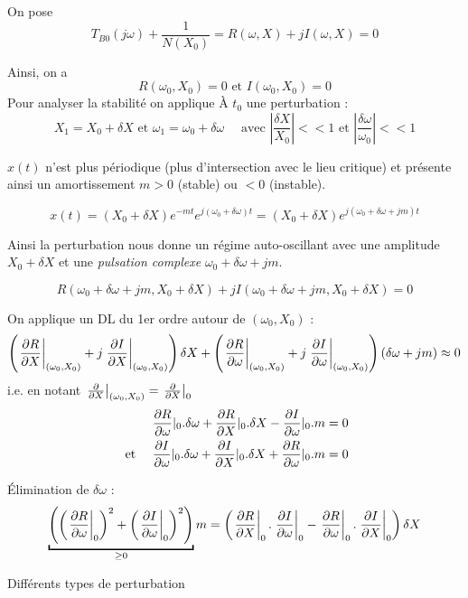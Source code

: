 \documentclass[main.tex]{subfiles}
\begin{document}
On pose \[T_{B0}(j\omega)+\frac{1}{N(X_0)}=R(\omega,X)+jI(\omega,X) = 0\]

Ainsi, on a \[R(\omega_0,X_0)=0 \text{ et }I(\omega_0,X_0)=0\]
Pour analyser la stabilité on applique À $t_0$  une perturbation :
\[X_1 = X_0 + \delta X \text{ et }\omega_1 = \omega_0+\delta \omega \quad \text{ avec } |\frac{\delta X}{X_0}|<<1 \text{ et }|\frac{\delta \omega}{\omega_0}|<<1 \]

$x(t)$ n'est plus périodique (plus d'intersection avec le lieu critique) et présente ainsi un amortissement $m>0$ (stable) ou $<0$ (instable).

\[ x(t) = (X_0 + \delta X) e^{-mt} e^{j(\omega_0 + \delta \omega) t} =(X_0 + \delta X) e^{j(\omega_0 + \delta \omega + jm) t} \]

Ainsi la perturbation nous donne un régime auto-oscillant avec une amplitude $X_0+\delta X$ et une \emph{pulsation complexe} $\omega_0 + \delta \omega + jm$.

\[ R(\omega_0+\delta \omega + jm, X_0 + \delta X) + jI(\omega_0 + \delta \omega + jm,X_0 + \delta X) = 0 \]

\newcommand{\zero}{(\omega_0,X_0)}
On applique un DL du 1er ordre autour de $\zero$ :
\[ \left(\left.\derivp[R]{X}\right|_{\zero} + j \left.\derivp[I]{X}\right|_{\zero}\right) \delta X + \left(\left.\derivp[R]{\omega}\right|_{\zero} + j \left.\derivp[I]{\omega}\right|_{\zero}\right)(\delta \omega + jm)\approx 0 \]
i.e. en notant $\left.\derivp[]{X}\right|_{\zero}=\left.\derivp[]{X}\right|_0$
\begin{align*}
\derivp[R]{\omega}|_0 .\delta \omega + \derivp[R]{X}|_0 .\delta X - \derivp[I]{\omega}|_0 .m & = 0 \\
\text{ et }\quad \derivp[I]{\omega}|_0 .\delta \omega + \derivp[I]{X}|_0 .\delta X + \derivp[R]{\omega}|_0 .m & = 0
\end{align*}

Élimination de $\delta \omega$ :
\[\underbracket{ \left( \left(\left.\derivp[R]{\omega}\right|_0\right)^2 + \left(\left.\derivp[I]{\omega}\right|_0\right)^2 \right)}_{\ge 0} m
  = \left( \left.\derivp[R]{X}\right|_0.\left.\derivp[I]{\omega}\right|_0 - \left.\derivp[R]{\omega}\right|_0.\left.\derivp[I]{X}\right|_0 \right) \delta X \]

\newpage
\noindent Différents types de perturbation
\end{document}
